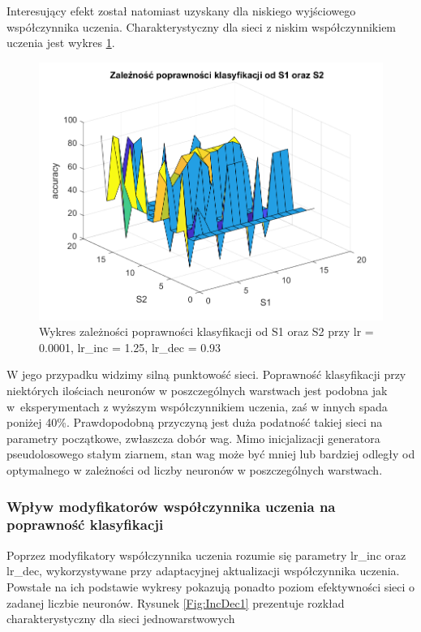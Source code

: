 \documentclass[12pt,twoside]{article}
\begin{document}
Interesujący efekt został natomiast uzyskany dla niskiego wyjściowego współczynnika uczenia.
Charakterystyczny dla sieci z niskim współczynnikiem uczenia jest wykres \ref{Fig:S1S2_2}.


\begin{figure}[ht]
	\centering
	\includegraphics[width=16cm]{figures/S1S2_2.png}
	\caption{Wykres zależności poprawności klasyfikacji od S1 oraz S2 przy lr = 0.0001, lr\_inc = 1.25, lr\_dec = 0.93}
	\label{Fig:S1S2_2}
\end{figure}

W jego przypadku widzimy silną punktowość sieci.
Poprawność klasyfikacji przy niektórych ilościach neuronów w poszczególnych warstwach jest podobna jak w~eksperymentach z wyższym współczynnikiem uczenia, zaś w innych spada poniżej 40\%.
Prawdopodobną przyczyną jest duża podatność takiej sieci na parametry początkowe, zwłaszcza dobór wag.
Mimo inicjalizacji generatora pseudolosowego stałym ziarnem, stan wag może być mniej lub bardziej odległy od optymalnego w zależności od liczby neuronów w poszczególnych warstwach.

\clearpage
\subsubsection{Wpływ modyfikatorów współczynnika uczenia na poprawność klasyfikacji}
Poprzez modyfikatory współczynnika uczenia rozumie się parametry lr\_inc oraz lr\_dec, wykorzystywane przy adaptacyjnej aktualizacji współczynnika uczenia.
Powstałe na ich podstawie wykresy pokazują ponadto poziom efektywności sieci o zadanej liczbie neuronów.
Rysunek \ref{Fig:IncDec1} prezentuje rozkład charakterystyczny dla sieci jednowarstwowych
\end{document}
